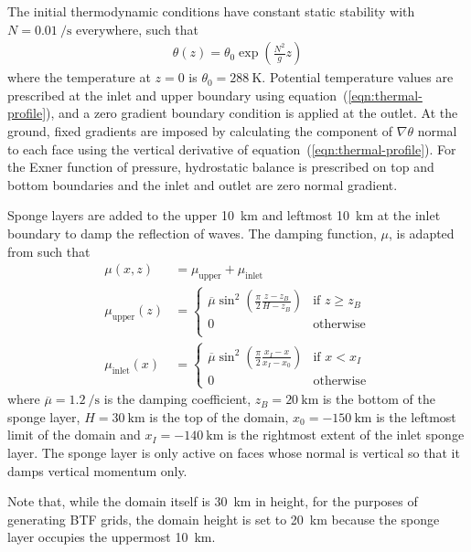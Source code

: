 \documentclass{ametsoc}
\begin{document}
The initial thermodynamic conditions have constant static stability with $N = \SI{0.01}{\per\second}$ everywhere, such that
\begin{align}
	\theta(z) = \theta_0 \exp \left( \frac{N^2}{g} z \right) \label{eqn:thermal-profile}
\end{align}
where the temperature at $z=0$ is $\theta_0 = \SI{288}{\kelvin}$.
Potential temperature values are prescribed at the inlet and upper boundary using equation~(\ref{eqn:thermal-profile}), and a zero gradient boundary condition is applied at the outlet.  At the ground, fixed gradients are imposed by calculating the component of $\nabla \theta$ normal to each face using the vertical derivative of equation~(\ref{eqn:thermal-profile}).
For the Exner function of pressure, hydrostatic balance is prescribed on top and bottom boundaries and the inlet and outlet are zero normal gradient.

Sponge layers are added to the upper \SI{10}{\kilo\meter} and leftmost \SI{10}{\kilo\meter} at the inlet boundary to damp the reflection of waves.
The damping function, \(\mu\), is adapted from \citet{melvin2010} such that
\begin{align}
	\mu(x, z) &= \mu_\mathrm{upper} + \mu_\mathrm{inlet} \\
	\mu_\mathrm{upper}(z) &= \begin{cases}
		\overline{\mu} \sin^2 \left( \frac{\pi}{2} \frac{z - z_B}{H - z_B} \right) & \text{if } z \geq z_B \\
		0 & \text{otherwise} \\
	\end{cases} \\
	\mu_\mathrm{inlet}(x) &= \begin{cases}
		\overline{\mu} \sin^2 \left( \frac{\pi}{2} \frac{x_I - x}{x_I - x_0} \right) & \text{if } x < x_I \\
		0 & \text{otherwise}
	\end{cases}
\end{align}
where $\overline{\mu} = \SI{1.2}{\per\second}$ is the damping coefficient, $z_B = \SI{20}{\kilo\meter}$ is the bottom of the sponge layer, $H = \SI{30}{\kilo\meter}$ is the top of the domain, $x_0 = \SI{-150}{\kilo\meter}$ is the leftmost limit of the domain and $x_I = \SI{-140}{\kilo\meter}$ is the rightmost extent of the inlet sponge layer.  The sponge layer is only active on faces whose normal is vertical so that it damps vertical momentum only.

Note that, while the domain itself is \SI{30}{\kilo\meter} in height, for the purposes of generating BTF grids, the domain height is set to \SI{20}{\kilo\meter} because the sponge layer occupies the uppermost \SI{10}{\kilo\meter}.
\end{document}
